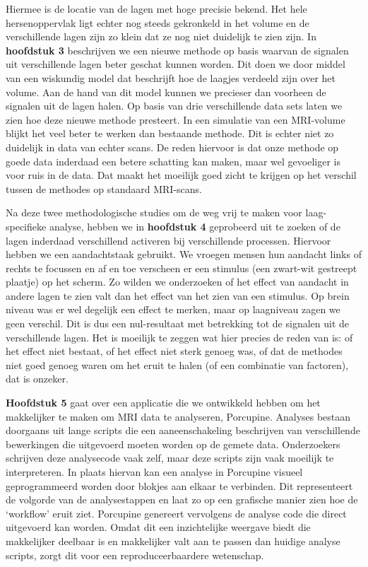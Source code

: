 Hiermee is de locatie van de lagen met hoge precisie bekend. Het hele hersenoppervlak ligt echter nog steeds gekronkeld in het volume en de verschillende lagen zijn zo klein dat ze nog niet duidelijk te zien zijn. In \textbf{hoofdstuk 3} beschrijven we een nieuwe methode op basis waarvan de signalen uit verschillende lagen beter geschat kunnen worden. Dit doen we door middel van een wiskundig model dat beschrijft hoe de laagjes verdeeld zijn over het volume. Aan de hand van dit model kunnen we precieser dan voorheen de signalen uit de lagen halen. Op basis van drie verschillende data sets laten we zien hoe deze nieuwe methode presteert. In een simulatie van een MRI-volume blijkt het veel beter te werken dan bestaande methode. Dit is echter niet zo duidelijk in data van echter scans. De reden hiervoor is dat onze methode op goede data inderdaad een betere schatting kan maken, maar wel gevoeliger is voor ruis in de data. Dat maakt het moeilijk goed zicht te krijgen op het verschil tussen de methodes op standaard MRI-scans.

Na deze twee methodologische studies om de weg vrij te maken voor laag-specifieke analyse, hebben we in \textbf{hoofdstuk 4} geprobeerd uit te zoeken of de lagen inderdaad verschillend activeren bij verschillende processen. Hiervoor hebben we een aandachtstaak gebruikt. We vroegen mensen hun aandacht links of rechts te focussen en af en toe verscheen er een stimulus (een zwart-wit gestreept plaatje) op het scherm. Zo wilden we onderzoeken of het effect van aandacht in andere lagen te zien valt dan het effect van het zien van een stimulus. Op brein niveau was er wel degelijk een effect te merken, maar op laagniveau zagen we geen verschil. Dit is dus een nul-resultaat met betrekking tot de signalen uit de verschillende lagen. Het is moeilijk te zeggen wat hier precies de reden van is: of het effect niet bestaat, of het effect niet sterk genoeg was, of dat de methodes niet goed genoeg waren om het eruit te halen (of een combinatie van factoren), dat is onzeker.

\textbf{Hoofdstuk 5} gaat over een applicatie die we ontwikkeld hebben om het makkelijker te maken om MRI data te analyseren, Porcupine. Analyses bestaan doorgaans uit lange scripts die een aaneenschakeling beschrijven van verschillende bewerkingen die uitgevoerd moeten worden op de gemete data. Onderzoekers schrijven deze analysecode vaak zelf, maar deze scripts zijn vaak moeilijk te interpreteren. In plaats hiervan kan een analyse in Porcupine visueel geprogrammeerd worden door blokjes aan elkaar te verbinden. Dit representeert de volgorde van de analysestappen en laat zo op een grafische manier zien hoe de `workflow' eruit ziet. Porcupine genereert vervolgens de analyse code die direct uitgevoerd kan worden. Omdat dit een inzichtelijke weergave biedt die makkelijker deelbaar is en makkelijker valt aan te passen dan huidige analyse scripts, zorgt dit voor een reproduceerbaardere wetenschap.

